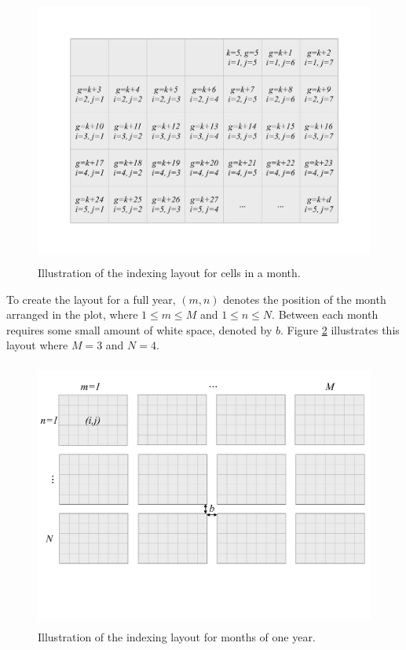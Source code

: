 \documentclass[article]{jss}
\theoremstyle{definition}
\theoremstyle{definition}
\theoremstyle{remark}
\begin{document}
\begin{CodeChunk}
\begin{figure}

{\centering \includegraphics[width=360pt,height=250pt]{figure/month} 

}

\caption[Illustration of the indexing layout for cells in
a month.]{Illustration of the indexing layout for cells in
a month.}\label{fig:month-diagram}
\end{figure}
\end{CodeChunk}




To create the layout for a full year, \((m, n)\) denotes the position of
the month arranged in the plot, where \(1 \le m \le M\) and
\(1 \le n \le N\). Between each month requires some small amount of
white space, denoted by \(b\). Figure \ref{fig:year-diagram} illustrates
this layout where \(M = 3\) and \(N = 4\).

\begin{CodeChunk}
\begin{figure}

{\centering \includegraphics[width=360pt,height=250pt]{figure/year} 

}

\caption[Illustration of the indexing layout for months of
one year.]{Illustration of the indexing layout for months of
one year.}\label{fig:year-diagram}
\end{figure}
\end{CodeChunk}
\end{document}
